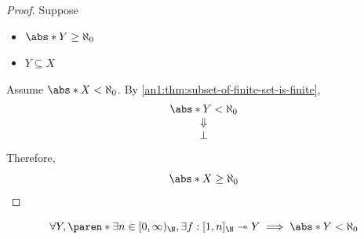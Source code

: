 \begin{proof}
  Suppose
  \begin{itemize}
    \item $\abs*{Y} \geq \aleph_{0}$
    \item $Y \subseteq X$
  \end{itemize}
  Assume $\abs*{X} < \aleph_{0}$. By \cref{an1:thm:subset-of-finite-set-is-finite},
  \[
    \begin{array}{c}
      \abs*{Y} < \aleph_{0} \\
      \Downarrow            \\
      \bot
    \end{array}
  \]
  Therefore,
  \[
    \abs*{X} \geq \aleph_{0}
  \]
\end{proof}

\begin{lemma} \label{an1:lem:surjection-from-Nn-implies-finite}
  \[
    \forall Y, \paren*{\exists n \in [0, \infty)_{\N}, \exists f: [1, n]_{\N} \twoheadrightarrow Y}
    \implies \abs*{Y} < \aleph_{0}
  \]
\end{lemma}

